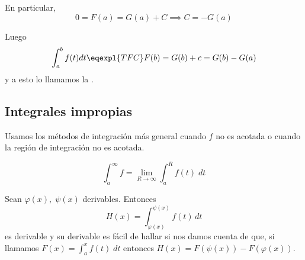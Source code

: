 \documentclass[nochap]{apuntes}
\begin{document}
En particular, \[ 0 = F(a) = G(a) + C \implies C = -G(a) \]

Luego \[\int_a^b f(t) dt \eqexpl{TFC} F(b) = G(b) + c = G(b) - G(a)\] y a esto lo llamamos la .


\subsection{Integrales impropias}

Usamos los métodos de integración más general cuando $f$ no es acotada o cuando la región de integración no es acotada.

\[ \int_a^\infty f = \lim_{R\to\infty}\int_a^R f(t)\;dt \]

Sean $\varphi(x),\; \psi(x)$ derivables. Entonces
\[H(x)=\int_{\varphi(x)}^{\psi(x)}f(t)\,dt \] es derivable y su derivable es fácil de hallar si nos damos cuenta de que, si llamamos $F(x)=\int_a^xf(t)\; dt$ entonces $H(x) = F(\psi(x))-F(\varphi(x))$.
\newpage
\printindex
\end{document}
